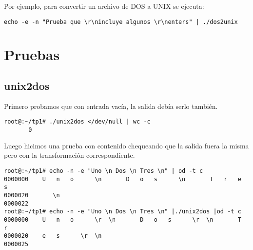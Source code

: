 \documentclass[a4paper,11pt]{article}
\begin{document}
\indent	
Por ejemplo, para convertir un archivo de DOS a UNIX se ejecuta: 

\begin{verbatim}
echo -e -n "Prueba que \r\nincluye algunos \r\nenters" | ./dos2unix 
\end{verbatim}

\section{Pruebas}
\subsection{unix2dos}
Primero probamos que con entrada vac\'ia, la salida deb\'ia serlo tambi\'en.
\begin{verbatim}
root@:~/tp1# ./unix2dos </dev/null | wc -c
       0
\end{verbatim}

Luego hicimos una prueba con contenido chequeando que la salida fuera la misma pero con la transformaci\'on correspondiente.
\begin{verbatim}
root@:~/tp1# echo -n -e "Uno \n Dos \n Tres \n" | od -t c
0000000    U   n   o      \n       D   o   s      \n       T   r   e   s
0000020       \n                                                        
0000022
root@:~/tp1# echo -n -e "Uno \n Dos \n Tres \n" |./unix2dos |od -t c
0000000    U   n   o      \r  \n       D   o   s      \r  \n       T   r
0000020    e   s      \r  \n                                            
0000025
\end{verbatim}
\end{document}
